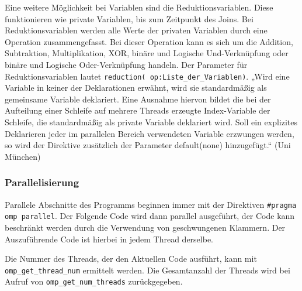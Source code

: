 \documentclass[../main.tex]{subfiles}
\begin{document}
Eine weitere Möglichkeit bei Variablen sind die Reduktionsvariablen. Diese funktionieren wie private Variablen, bis zum Zeitpunkt des Joins. Bei Reduktionsvariablen werden alle Werte der privaten Variablen durch eine Operation zusammengefasst. Bei dieser Operation kann es sich um die Addition, Subtraktion, Multiplikation, XOR, binäre und Logische Und-Verknüpfung oder binäre und Logische Oder-Verknüpfung handeln. Der Parameter für Reduktionsvariablen lautet \texttt{reduction( op:Liste\_der\_Variablen)}.
„Wird eine Variable in keiner der Deklarationen erwähnt, wird sie standardmäßig als gemeinsame Variable deklariert. Eine Ausnahme hiervon bildet die bei der Aufteilung einer Schleife auf mehrere Threads erzeugte Index-Variable der Schleife, die standardmäßig als private Variable deklariert wird. Soll ein explizites Deklarieren jeder im parallelen Bereich verwendeten Variable erzwungen werden, so wird der Direktive zusätzlich der Parameter default(none) hinzugefügt.“ (Uni München)

\subsubsection{Parallelisierung}

Parallele Abschnitte des Programms beginnen immer mit der Direktiven \texttt{\#pragma omp parallel}. Der Folgende Code wird dann parallel ausgeführt, der Code kann beschränkt werden durch die Verwendung von geschwungenen Klammern. Der Auszuführende Code ist hierbei in jedem Thread derselbe. 

Die Nummer des Threads, der den Aktuellen Code ausführt, kann mit \texttt{omp\_get\_thread\_num} ermittelt werden. Die Gesamtanzahl der Threads wird bei Aufruf von \texttt{omp\_get\_num\_threads} zurückgegeben.
\end{document}
